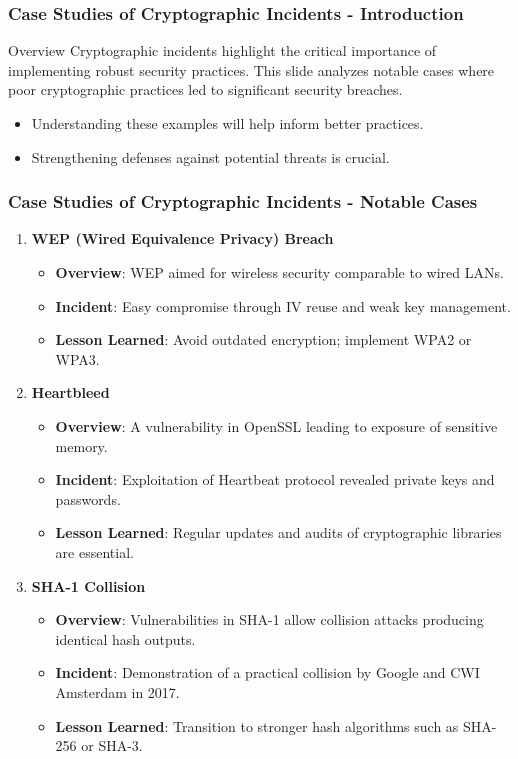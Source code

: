 \documentclass{beamer}
\begin{document}
\begin{frame}[fragile]
    \frametitle{Case Studies of Cryptographic Incidents - Introduction}
    \begin{block}{Overview}
        Cryptographic incidents highlight the critical importance of implementing robust security practices. This slide analyzes notable cases where poor cryptographic practices led to significant security breaches.
    \end{block}
    \begin{itemize}
        \item Understanding these examples will help inform better practices.
        \item Strengthening defenses against potential threats is crucial.
    \end{itemize}
\end{frame}

\begin{frame}[fragile]
    \frametitle{Case Studies of Cryptographic Incidents - Notable Cases}
    \begin{enumerate}
        \item \textbf{WEP (Wired Equivalence Privacy) Breach}
            \begin{itemize}
                \item \textbf{Overview}: WEP aimed for wireless security comparable to wired LANs.
                \item \textbf{Incident}: Easy compromise through IV reuse and weak key management.
                \item \textbf{Lesson Learned}: Avoid outdated encryption; implement WPA2 or WPA3.
            \end{itemize}
        
        \item \textbf{Heartbleed}
            \begin{itemize}
                \item \textbf{Overview}: A vulnerability in OpenSSL leading to exposure of sensitive memory.
                \item \textbf{Incident}: Exploitation of Heartbeat protocol revealed private keys and passwords.
                \item \textbf{Lesson Learned}: Regular updates and audits of cryptographic libraries are essential.
            \end{itemize}
        
        \item \textbf{SHA-1 Collision}
            \begin{itemize}
                \item \textbf{Overview}: Vulnerabilities in SHA-1 allow collision attacks producing identical hash outputs.
                \item \textbf{Incident}: Demonstration of a practical collision by Google and CWI Amsterdam in 2017.
                \item \textbf{Lesson Learned}: Transition to stronger hash algorithms such as SHA-256 or SHA-3.
            \end{itemize}
    \end{enumerate}
\end{frame}
\end{document}
